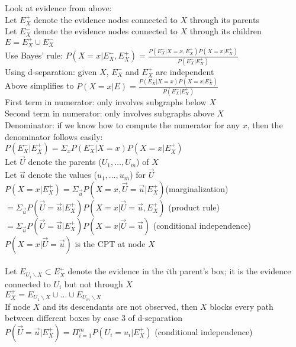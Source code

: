 \documentclass[10pt,letterpaper,unboxed,cm]{article}
\begin{document}
Look at evidence from above: \\
Let $E_X^+$ denote the evidence nodes connected to $X$ through its parents\\
Let $E_X^-$ denote the evidence nodes connected to $X$ through its children\\
$E = E_X^+ \cup E_X^-$\\
Use Bayes' rule: $P(X=x|E_X^-, E_X^+) = \frac{P(E_X^-|X=x,E_X^+)P(X=x|E_X^+)}{P(E_X^-|E_X^+)}$\\
Using d-separation: given $X$, $E_X^-$ and $E_X^+$ are independent\\
Above simplifies to $P(X=x|E) = \frac{P(E_X^-|X=x)P(X=x|E_X^+)}{P(E_X^-|E_X^+)}$\\
First term in numerator: only involves subgraphs below $X$\\
Second term in numerator: only involves subgraphs above $X$\\
Denominator: if we know how to compute the numerator for any $x$, then the denominator follows easily: \\
$P(E_X^-|E_X^+) = \Sigma_x P(E_X^-|X=x)P(X=x|E_X^+)$\\
Let $\overrightarrow{U}$ denote the parents ($U_1, \ldots, U_m$) of $X$\\
Let $\overrightarrow{u}$ denote the values ($u_1, \ldots, u_m$) for $\overrightarrow{U}$\\ 
$P(X=x|E_X^+) = \Sigma_{\overrightarrow{u}}P(X=x,\overrightarrow{U} = \overrightarrow{u}|E_X^+)$(marginalization)\\
$ = \Sigma_{\overrightarrow{u}}P(\overrightarrow{U} = \overrightarrow{u}|E_X^+)P(X=x|\overrightarrow{U} = \overrightarrow{u}, E_X^+)$ (product rule)\\
$ = \Sigma_{\overrightarrow{u}}P(\overrightarrow{U} = \overrightarrow{u}|E_X^+)P(X=x|\overrightarrow{U} = \overrightarrow{u})$ (conditional independence)\\
$P(X=x|\overrightarrow{U} = \overrightarrow{u})$ is the CPT at node $X$\\\\
Let $E_{U_i\backslash X} \subset E_X^+$ denote the evidence in the $i$th parent's box; it is the evidence connected to $U_i$ but not through $X$\\
$E_X^+ = E_{U_1\backslash X} \cup \ldots \cup E_{U_m\backslash X}$\\
If node $X$ and its descendants are not observed, then $X$ blocks every path between different boxes by case 3 of d-separation\\
$P(\overrightarrow{U} = \overrightarrow{u}|E_X^+) = \Pi^m_{i=1}P(U_i = u_i|E_X^+)$ (conditional independence)\\
\end{document}
